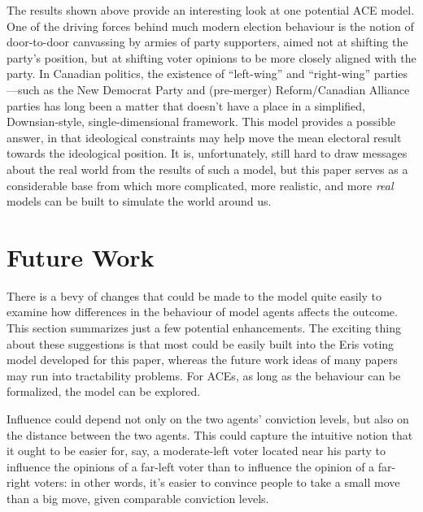 \documentclass[12pt]{article}
\numberwithin{equation}{subsection}
\begin{document}
The results shown above provide an interesting look at one potential ACE model.  One of the driving
forces behind much modern election behaviour is the notion of door-to-door canvassing by armies of
party supporters, aimed not at shifting the party's position, but at shifting voter opinions to be
more closely aligned with the party.  In Canadian politics, the existence of ``left-wing'' and
``right-wing'' parties---such as the New Democrat Party and (pre-merger) Reform/Canadian Alliance
parties has long been a matter that doesn't have a place in a simplified, Downsian-style,
single-dimensional framework.  This model provides a possible answer, in that ideological
constraints may help move the mean electoral result towards the ideological position.  It is,
unfortunately, still hard to draw messages about the real world from the results of such a model,
but this paper serves as a considerable base from which more complicated, more realistic, and more
\emph{real} models can be built to simulate the world around us.


\section{Future Work}

There is a bevy of changes that could be made to the model quite easily to examine how differences
in the behaviour of model agents affects the outcome.  This section summarizes just a few potential
enhancements.  The exciting thing about these suggestions is that most could be easily built into
the Eris voting model developed for this paper, whereas the future work ideas of many papers may run
into tractability problems.  For ACEs, as long as the behaviour can be formalized, the model can be
explored.

Influence could depend not only on the two agents' conviction levels, but also on the
distance between the two agents.  This could capture the intuitive notion that it ought to
be easier for, say, a moderate-left voter located near his party to influence the opinions
of a far-left voter than to influence the opinion of a far-right voters: in other words,
it's easier to convince people to take a small move than a big move, given comparable
conviction levels.
\end{document}
